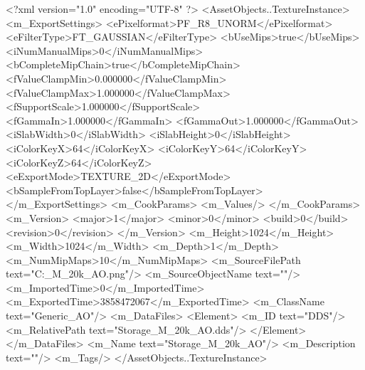<?xml version="1.0" encoding="UTF-8" ?>
<AssetObjects..TextureInstance>
	<m_ExportSettings>
		<ePixelformat>PF_R8_UNORM</ePixelformat>
		<eFilterType>FT_GAUSSIAN</eFilterType>
		<bUseMips>true</bUseMips>
		<iNumManualMips>0</iNumManualMips>
		<bCompleteMipChain>true</bCompleteMipChain>
		<fValueClampMin>0.000000</fValueClampMin>
		<fValueClampMax>1.000000</fValueClampMax>
		<fSupportScale>1.000000</fSupportScale>
		<fGammaIn>1.000000</fGammaIn>
		<fGammaOut>1.000000</fGammaOut>
		<iSlabWidth>0</iSlabWidth>
		<iSlabHeight>0</iSlabHeight>
		<iColorKeyX>64</iColorKeyX>
		<iColorKeyY>64</iColorKeyY>
		<iColorKeyZ>64</iColorKeyZ>
		<eExportMode>TEXTURE_2D</eExportMode>
		<bSampleFromTopLayer>false</bSampleFromTopLayer>
	</m_ExportSettings>
	<m_CookParams>
		<m_Values/>
	</m_CookParams>
	<m_Version>
		<major>1</major>
		<minor>0</minor>
		<build>0</build>
		<revision>0</revision>
	</m_Version>
	<m_Height>1024</m_Height>
	<m_Width>1024</m_Width>
	<m_Depth>1</m_Depth>
	<m_NumMipMaps>10</m_NumMipMaps>
	<m_SourceFilePath text="C:\Users\Shadow\Desktop\Prototypes\Storage_M_20k_AO.png"/>
	<m_SourceObjectName text=""/>
	<m_ImportedTime>0</m_ImportedTime>
	<m_ExportedTime>3858472067</m_ExportedTime>
	<m_ClassName text="Generic_AO"/>
	<m_DataFiles>
		<Element>
			<m_ID text="DDS"/>
			<m_RelativePath text="Storage_M_20k_AO.dds"/>
		</Element>
	</m_DataFiles>
	<m_Name text="Storage_M_20k_AO"/>
	<m_Description text=""/>
	<m_Tags/>
</AssetObjects..TextureInstance>


